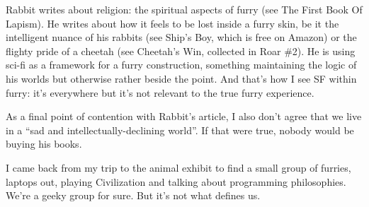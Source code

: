 Rabbit writes about religion: the spiritual aspects of furry (see The First Book Of Lapism). He writes about how it feels to be lost inside a furry skin, be it the intelligent nuance of his rabbits (see Ship's Boy, which is free on Amazon) or the flighty pride of a cheetah (see Cheetah's Win, collected in Roar \#2). He is using sci-fi as a framework for a furry construction, something maintaining the logic of his worlds but otherwise rather beside the point. And that's how I see SF within furry: it's everywhere but it's not relevant to the true furry experience.

As a final point of contention with Rabbit's article, I also don't agree that we live in a ``sad and intellectually-declining world''. If that were true, nobody would be buying his books.

\secdiv

I came back from my trip to the animal exhibit to find a small group of furries, laptops out, playing Civilization and talking about programming philosophies. We're a geeky group for sure. But it's not what defines us.
